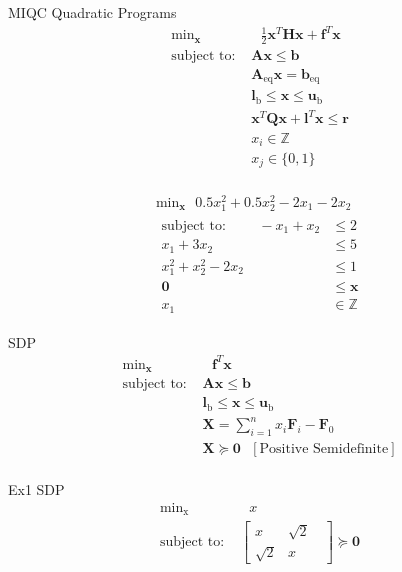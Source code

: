 \documentclass{article}
\begin{document}
MIQC Quadratic Programs
\begin{align*}
    \text{min}_{\mathbf{x}}& \text{ } \frac{1}{2}\mathbf{x}^T \mathbf{H} \mathbf{x} + \mathbf{f}^T \mathbf{x} \\
    \mbox{subject to: }& \mathbf{A}\mathbf{x} \le \mathbf{b}\\
                       & \mathbf{A}_\text{eq}\mathbf{x} = \mathbf{b}_\text{eq}\\
                       & \mathbf{l}_{\text{b}} \le \mathbf{x} \le \mathbf{u}_{\text{b}}\\
                       & \mathbf{x}^T \mathbf{Q} \mathbf{x} + \mathbf{l}^T \mathbf{x} \le \mathbf{r}\\
                       & x_i \in \mathbb{Z}\\
                       & x_j \in \{0,1\}\\
\end{align*}

\begin{align*}
    \text{min}_{\mathbf{x}} \text{ } 0.5x_1^2 + 0.5x_2^2 - 2x_1 - 2x_2\\
    \begin{aligned}
    \mbox{subject to: } \qquad -x_1 + x_2 &\le 2\\
                        x_1 + 3x_2 &\le 5\\
                        x_1^2 + x_2^2 - 2x_2 &\le 1\\
                        \mathbf{0} &\le \mathbf{x}\\
                        x_1 &\in \mathbb{Z}
    \end{aligned}
\end{align*}

SDP
\begin{align*}
    \text{min}_{\mathbf{x}}& \text{ } \mathbf{f}^T \mathbf{x} \\
    \mbox{subject to: }& \mathbf{A}\mathbf{x} \le \mathbf{b}\\
                       & \mathbf{l}_{\text{b}} \le \mathbf{x} \le \mathbf{u}_{\text{b}}\\
                       & \mathbf{X} = \sum_{i=1}^n x_i \mathbf{F}_i - \mathbf{F}_0\\
                       & \mathbf{X} \succeq \mathbf{0} \text{  } [\text{Positive Semidefinite}]\\
\end{align*}

Ex1 SDP
\begin{align*}
    \text{min}_{\text{x}}& \text{ } x\\
    \mbox{subject to: }& \left[\begin{matrix} x & \sqrt{2} \\ \sqrt{2} & x \end{matrix}\text{ }\right] \succeq \mathbf{0}\\
\end{align*}
\end{document}

